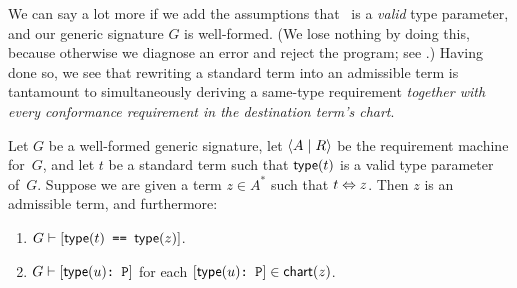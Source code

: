 \documentclass[../generics]{subfiles}
\begin{document}
We can say a lot more if we add the assumptions that \tT\ is a \emph{valid} type parameter, and our generic signature $G$ is well-formed. (We lose nothing by doing this, because otherwise we diagnose an error and reject the program; see .) Having done so, we see that rewriting a standard term into an admissible term is tantamount to simultaneously deriving a same-type requirement \textsl{together with every conformance requirement in the destination term's chart}.

\begin{theorem}\label{type chart theorem}
Let $G$ be a well-formed generic signature, let $\langle A \mid R\rangle$ be the requirement machine for~$G$, and let $t$ be a standard term such that $\mathsf{type}(t)$ is a valid type parameter of~$G$. Suppose we are given a term $z\in A^*$ such that $t \Leftrightarrow z$. Then $z$ is an admissible term, and furthermore:
\begin{enumerate}
\item $G \vdash [\texttt{$\mathsf{type}(t)$ == $\mathsf{type}(z)$}]$.
\item $G \vdash [\texttt{$\mathsf{type}(u)$:~P}]$ for each $[\texttt{$\mathsf{type}(u)$:~P}]\in\mathsf{chart}(z)$.
\end{enumerate}
\end{theorem}
\end{document}
